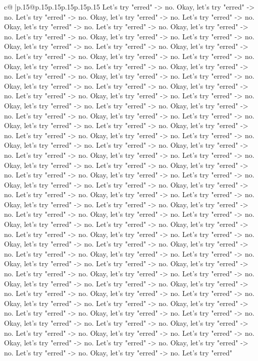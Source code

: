 \documentclass{article}
\begin{document}
{\begin{supertabular}{c@{$\;$}|p{.15\linewidth}@{}p{.15\linewidth}p{.15\linewidth}p{.15\linewidth}p{.15\linewidth}p{.15\linewidth}}
{{{Let's try "erred" {-}> no. Okay, let's try "erred" {-}> no. Let's try "erred" {-}> no. Okay, let's try "erred" {-}> no. Let's try "erred" {-}> no. Okay, let's try "erred" {-}> no. Let's try "erred" {-}> no. Okay, let's try "erred" {-}> no. Let's try "erred" {-}> no. Okay, let's try "erred" {-}> no. Let's try "erred" {-}> no. Okay, let's try "erred" {-}> no. Let's try "erred" {-}> no. Okay, let's try "erred" {-}> no. Let's try "erred" {-}> no. Okay, let's try "erred" {-}> no. Let's try "erred" {-}> no. Okay, let's try "erred" {-}> no. Let's try "erred" {-}> no. Okay, let's try "erred" {-}> no. Let's try "erred" {-}> no. Okay, let's try "erred" {-}> no. Let's try "erred" {-}> no. Okay, let's try "erred" {-}> no. Let's try "erred" {-}> no. Okay, let's try "erred" {-}> no. Let's try "erred" {-}> no. Okay, let's try "erred" {-}> no. Let's try "erred" {-}> no. Okay, let's try "erred" {-}> no. Let's try "erred" {-}> no. Okay, let's try "erred" {-}> no. Let's try "erred" {-}> no. Okay, let's try "erred" {-}> no. Let's try "erred" {-}> no. Okay, let's try "erred" {-}> no. Let's try "erred" {-}> no. Okay, let's try "erred" {-}> no. Let's try "erred" {-}> no. Okay, let's try "erred" {-}> no. Let's try "erred" {-}> no. Okay, let's try "erred" {-}> no. Let's try "erred" {-}> no. Okay, let's try "erred" {-}> no. Let's try "erred" {-}> no. Okay, let's try "erred" {-}> no. Let's try "erred" {-}> no. Okay, let's try "erred" {-}> no. Let's try "erred" {-}> no. Okay, let's try "erred" {-}> no. Let's try "erred" {-}> no. Okay, let's try "erred" {-}> no. Let's try "erred" {-}> no. Okay, let's try "erred" {-}> no. Let's try "erred" {-}> no. Okay, let's try "erred" {-}> no. Let's try "erred" {-}> no. Okay, let's try "erred" {-}> no. Let's try "erred" {-}> no. Okay, let's try "erred" {-}> no. Let's try "erred" {-}> no. Okay, let's try "erred" {-}> no. Let's try "erred" {-}> no. Okay, let's try "erred" {-}> no. Let's try "erred" {-}> no. Okay, let's try "erred" {-}> no. Let's try "erred" {-}> no. Okay, let's try "erred" {-}> no. Let's try "erred" {-}> no. Okay, let's try "erred" {-}> no. Let's try "erred" {-}> no. Okay, let's try "erred" {-}> no. Let's try "erred" {-}> no. Okay, let's try "erred" {-}> no. Let's try "erred" {-}> no. Okay, let's try "erred" {-}> no. Let's try "erred" {-}> no. Okay, let's try "erred" {-}> no. Let's try "erred" {-}> no. Okay, let's try "erred" {-}> no. Let's try "erred" {-}> no. Okay, let's try "erred" {-}> no. Let's try "erred" {-}> no. Okay, let's try "erred" {-}> no. Let's try "erred" {-}> no. Okay, let's try "erred" {-}> no. Let's try "erred" {-}> no. Okay, let's try "erred" {-}> no. Let's try "erred" {-}> no. Okay, let's try "erred" {-}> no. Let's try "erred" {-}> no. Okay, let's try "erred" {-}> no. Let's try "erred" {-}> no. Okay, let's try "erred" {-}> no. Let's try "erred" {-}> no. Okay, let's try "erred" {-}> no. Let's try "erred" {-}> no. Okay, let's try "erred" {-}> no. Let's try "erred" {-}> no. Okay, let's try "erred" {-}> no. Let's try "erred" {-}> no. Okay, let's try "erred" {-}> no. Let's try "erred" {-}> no. Okay, let's try "erred" {-}> no. Let's try "erred" {-}> no. Okay, let's try "erred" {-}> no. Let's try "erred" }}}
\end{supertabular}}
\end{document}
